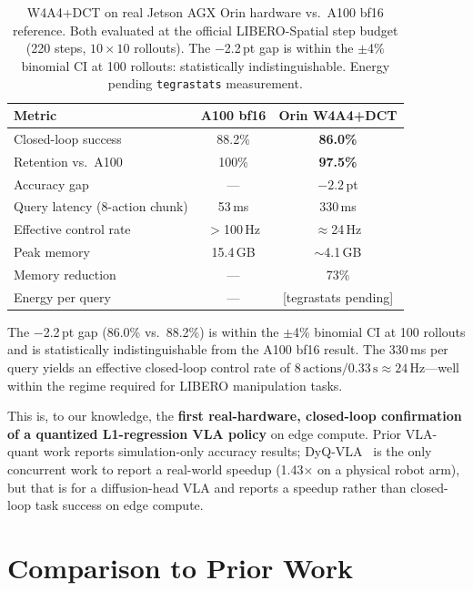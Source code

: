 \documentclass[conference]{IEEEtran}
\begin{document}
\begin{table}[t]\centering\small
\caption{W4A4+DCT on real Jetson AGX Orin hardware vs.\ A100 bf16 reference. Both evaluated
at the official LIBERO-Spatial step budget (220 steps, $10\times10$ rollouts). The $-$2.2\,pt
gap is within the $\pm$4\% binomial CI at 100 rollouts: statistically indistinguishable.
Energy pending \texttt{tegrastats} measurement.}
\label{tab:orin}
\begin{tabular}{lcc}
\toprule
Metric & A100 bf16 & Orin W4A4+DCT \\
\midrule
Closed-loop success & 88.2\% & \textbf{86.0\%} \\
Retention vs.\ A100 & 100\% & \textbf{97.5\%} \\
Accuracy gap & --- & $-2.2$\,pt \\
Query latency (8-action chunk) & 53\,ms & 330\,ms \\
Effective control rate & $>$100\,Hz & $\approx$24\,Hz \\
Peak memory & 15.4\,GB & $\sim$4.1\,GB \\
Memory reduction & --- & 73\% \\
Energy per query & --- & {[tegrastats pending]} \\
\bottomrule
\end{tabular}
\end{table}

The $-$2.2\,pt gap (86.0\% vs.\ 88.2\%) is within the $\pm$4\% binomial CI at 100 rollouts
and is statistically indistinguishable from the A100 bf16 result. The 330\,ms per query
yields an effective closed-loop control rate of $8\,\text{actions} / 0.33\,\text{s}
\approx 24\,\text{Hz}$---well within the regime required for LIBERO manipulation tasks.

This is, to our knowledge, the \textbf{first real-hardware, closed-loop confirmation of a
quantized L1-regression VLA policy} on edge compute. Prior VLA-quant work reports
simulation-only accuracy results; DyQ-VLA~\cite{dyqvla} is the only concurrent work to
report a real-world speedup (1.43$\times$ on a physical robot arm), but that is for a
diffusion-head VLA and reports a speedup rather than closed-loop task success on edge compute.

\section{Comparison to Prior Work}
\label{sec:comparison}
\end{document}
